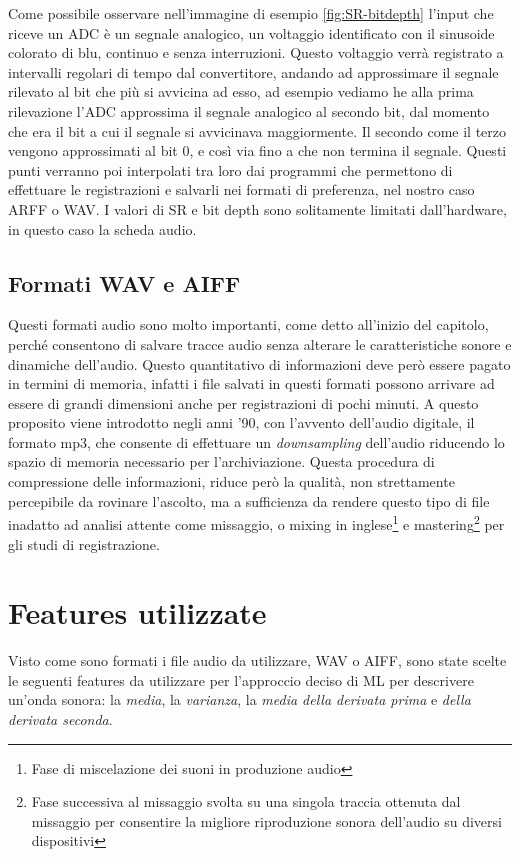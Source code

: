 Come possibile osservare nell'immagine di esempio \ref{fig:SR-bitdepth} l'input che riceve un ADC è un segnale analogico, un voltaggio identificato con il sinusoide colorato di blu, continuo e senza interruzioni. Questo voltaggio verrà registrato a intervalli regolari di tempo dal convertitore, andando ad approssimare il segnale rilevato al bit che più si avvicina ad esso, ad esempio vediamo he alla prima rilevazione l'ADC approssima il segnale analogico al secondo bit, dal momento che era il bit a cui il segnale si avvicinava maggiormente. Il secondo come il terzo vengono approssimati al bit 0, e così via fino a che non termina il segnale. Questi punti verranno poi interpolati tra loro dai programmi che permettono di effettuare le registrazioni e salvarli nei formati di preferenza, nel nostro caso ARFF o WAV.
I valori di SR e bit depth sono solitamente limitati dall'hardware, in questo caso la scheda audio.

\subsection{Formati WAV e AIFF}
Questi formati audio sono molto importanti, come detto all'inizio del capitolo, perché consentono di salvare tracce audio senza alterare le caratteristiche sonore e dinamiche dell'audio. Questo quantitativo di informazioni deve però essere pagato in termini di memoria, infatti i file salvati in questi formati possono arrivare ad essere di grandi dimensioni anche per registrazioni di pochi minuti. A questo proposito viene introdotto negli anni '90, con l'avvento dell'audio digitale, il formato mp3, che consente di effettuare un \emph{downsampling} dell'audio riducendo lo spazio di memoria necessario per l'archiviazione. Questa procedura di compressione delle informazioni, riduce però la qualità, non strettamente percepibile da rovinare l'ascolto, ma a sufficienza da rendere questo tipo di file inadatto ad analisi attente come missaggio, o mixing in inglese\footnote{Fase di miscelazione dei suoni in produzione audio} e mastering\footnote{Fase successiva al missaggio svolta su una singola traccia ottenuta dal missaggio per consentire la migliore riproduzione sonora dell'audio su diversi dispositivi} per gli studi di registrazione.

\section{Features utilizzate}
Visto come sono formati i file audio da utilizzare, WAV o AIFF, sono state scelte le seguenti features da utilizzare per l'approccio deciso di ML per descrivere un'onda sonora: la \emph{media}, la \emph{varianza}, la \emph{media della derivata prima} e  \emph{della derivata seconda}.



%
